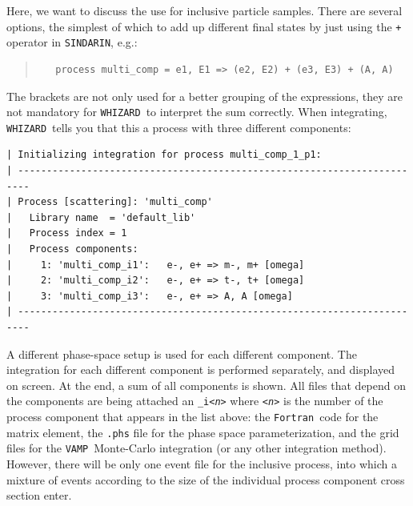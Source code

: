\documentclass[12pt]{book}
\newcommand{\ttt}[1]{\texttt{#1}}
\newcommand{\whizard}{\ttt{WHIZARD}}
\newcommand{\vamp}{\ttt{VAMP}}
\newcommand{\sindarin}{\ttt{SINDARIN}}
\newcommand{\fortran}{\ttt{Fortran}}
\begin{document}
Here, we want to discuss the use for inclusive particle samples. There
are several options, the simplest of which to add up different final
states by just using the \ttt{+} operator in \sindarin, e.g.:
\begin{quote}
\begin{footnotesize}
\begin{verbatim}
   process multi_comp = e1, E1 => (e2, E2) + (e3, E3) + (A, A)
\end{verbatim}
\end{footnotesize}
\end{quote}
The brackets are not only used for a better grouping of the expressions,
they are not mandatory for \whizard\ to interpret the sum
correctly. When integrating, \whizard\ tells you that this a process
with three different components:
\begin{footnotesize}
\begin{Verbatim}
| Initializing integration for process multi_comp_1_p1:
| ------------------------------------------------------------------------
| Process [scattering]: 'multi_comp'
|   Library name  = 'default_lib'
|   Process index = 1
|   Process components:
|     1: 'multi_comp_i1':   e-, e+ => m-, m+ [omega]
|     2: 'multi_comp_i2':   e-, e+ => t-, t+ [omega]
|     3: 'multi_comp_i3':   e-, e+ => A, A [omega]
| ------------------------------------------------------------------------
\end{Verbatim}
\end{footnotesize}
A different phase-space setup is used for each different
component. The integration for each different component is performed
separately, and displayed on screen. At the end, a sum of all
components is shown. All files that depend on the components are being
attached an \ttt{\_i{\em <n>}} where \ttt{{\em <n>}} is the number of
the process component that appears in the list above: the \fortran\
code for the matrix element, the \ttt{.phs} file for the phase space
parameterization, and the grid files for the \vamp\ Monte-Carlo
integration (or any other integration method). However, there will be
only one event file for the inclusive process, into which a mixture of
events according to the size of the individual process component cross
section enter.
\end{document}
